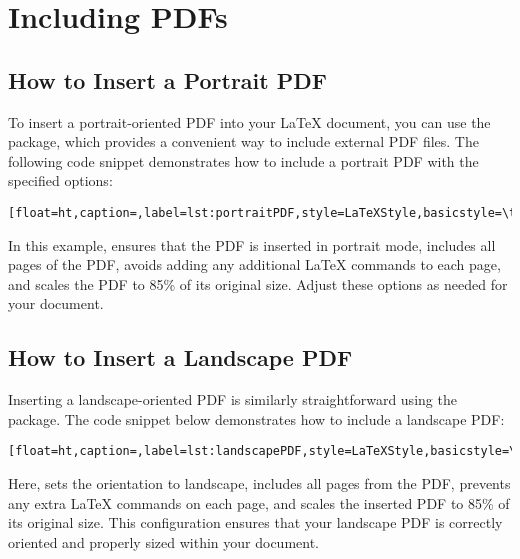 \chapter{Including PDFs}\label{sec:includingpdfs}
	
	
	\section{How to Insert a Portrait PDF}
		To insert a portrait-oriented PDF into your LaTeX document, you can use the  package, which provides a convenient way to include external PDF files. 
		The following code snippet demonstrates how to include a portrait PDF with the specified options:
		
		\begin{lstlisting}[float=ht,caption=,label=lst:portraitPDF,style=LaTeXStyle,basicstyle=\ttfamily,]

		\end{lstlisting}
		
		In this example,  ensures that the PDF is inserted in portrait mode,  includes all pages of the PDF,  avoids adding any additional LaTeX commands to each page, and  scales the PDF to 85\% of its original size. 
		Adjust these options as needed for your document.
		
		
	\section{How to Insert a Landscape PDF}
		Inserting a landscape-oriented PDF is similarly straightforward using the  package. 
		The code snippet below demonstrates how to include a landscape PDF:
		
		\begin{lstlisting}[float=ht,caption=,label=lst:landscapePDF,style=LaTeXStyle,basicstyle=\ttfamily,]

		\end{lstlisting}
		
		Here,  sets the orientation to landscape,  includes all pages from the PDF,  prevents any extra LaTeX commands on each page, and  scales the inserted PDF to 85\% of its original size. 
		This configuration ensures that your landscape PDF is correctly oriented and properly sized within your document.
		
		